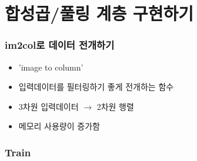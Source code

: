 \documentclass{beamer}
\begin{document}
\section{합성곱/풀링 계층 구현하기}
\begin{frame}
	\frametitle{im2col로 데이터 전개하기}
		\begin{itemize}
			\item 'image to column'
			\item 입력데이터를 필터링하기 좋게 전개하는 함수
			\item 3차원 입력데이터 $\rightarrow$ 2차원 행렬
			\item 메모리 사용량이 증가함


			\begin{figure}
				\hspace{0.8cm}
			\end{figure}
		\end{itemize}
\end{frame}

\begin{frame}
	\frametitle{Train}
			\begin{figure}
				\hspace{0.8cm}
			\end{figure}
\end{frame}



\end{document}
